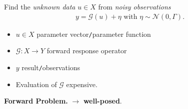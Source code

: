 \documentclass[oneside,11pt]{book}
\numberwithin{equation}{section}
\begin{document}
%
Find the \textit{unknown data} $u\in X$ from \textit{noisy observations}
\begin{align*}
    y = \mathcal{G}(u) + \eta \mbox{ with } \eta\sim\mathcal{N}(0,\Gamma).
\end{align*}
\begin{itemize}
    \item $u\in X$ parameter vector\texttt{/}parameter function
    \item $\mathcal{G}:X\to Y$ forward response operator
    \item $y$ result\texttt{/}observations
    \item Evaluation of $\mathcal{G}$ expensive.
\end{itemize}

\textbf{Forward Problem.}  $\to$ \textbf{well-posed}.
\end{document}
